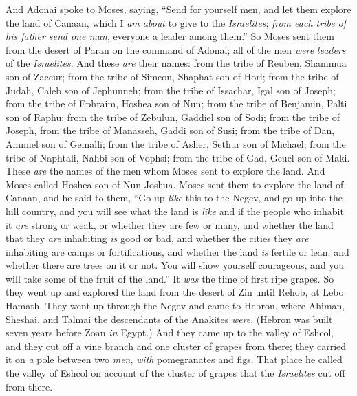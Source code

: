 \begin{biblechapter} %
 And Adonai spoke to Moses, saying,
\verse “Send for yourself men, and let them explore the land of Canaan, which I \textit{am about} to give to the \textit{Israelites}; \textit{from each tribe of his father send one man}, everyone a leader among them.”
\verse So Moses sent them from the desert of Paran on the command of Adonai; all of the men \textit{were} \textit{leaders} of the \textit{Israelites}.
\verse And these \textit{are} their names: from the tribe of Reuben, Shammua son of Zaccur;
\verse from the tribe of Simeon, Shaphat son of Hori;
\verse from the tribe of Judah, Caleb son of Jephunneh;
\verse from the tribe of Issachar, Igal son of Joseph;
\verse from the tribe of Ephraim, Hoshea son of Nun;
\verse from the tribe of Benjamin, Palti son of Raphu;
\verse from the tribe of Zebulun, Gaddiel son of Sodi;
\verse from the tribe of Joseph, from the tribe of Manasseh, Gaddi son of Susi;
\verse from the tribe of Dan, Ammiel son of Gemalli;
\verse from the tribe of Asher, Sethur son of Michael;
\verse from the tribe of Naphtali, Nahbi son of Vophsi;
\verse from the tribe of Gad, Geuel son of Maki.
\verse These \textit{are} the names of the men whom Moses sent to explore the land. And Moses called Hoshea son of Nun Joshua.
\verse Moses sent them to explore the land of Canaan, and he said to them, “Go up \textit{like} this to the Negev, and go up into the hill country,
\verse and you will see what the land is \textit{like} and if the people who inhabit it \textit{are} strong or weak, or whether they are few or many,
\verse and whether the land that they \textit{are} inhabiting \textit{is} good or bad, and whether the cities they \textit{are} inhabiting are camps or fortifications,
\verse and whether the land \textit{is} fertile or lean, and whether there are trees on it or not. You will show yourself courageous, and you will take some of the fruit of the land.” It \textit{was} the time of first ripe grapes.
\verse So they went up and explored the land from the desert of Zin until Rehob, at Lebo Hamath.
\verse They went up through the Negev and came to Hebron, where Ahiman, Sheshai, and Talmai the descendants of the Anakites \textit{were}. (Hebron was built seven years before Zoan \textit{in} Egypt.)
\verse And they came up to the valley of Eshcol, and they cut off a vine branch and one cluster of grapes from there; they carried it on \textit{a} pole between two \textit{men}, \textit{with} pomegranates and figs.
\verse That place he called the valley of Eshcol on account of the cluster of grapes that the \textit{Israelites} cut off from there.

\end{biblechapter}
